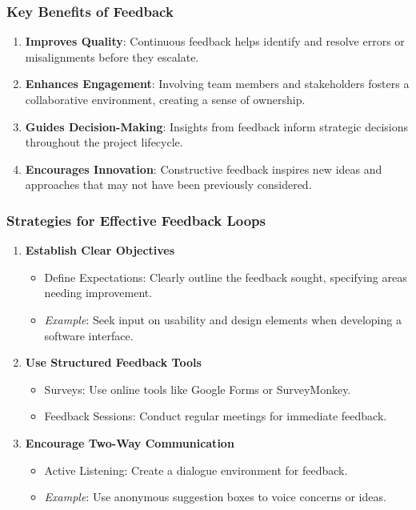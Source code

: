 \documentclass[aspectratio=169]{beamer}
\begin{document}
\begin{frame}[fragile]
    \frametitle{Key Benefits of Feedback}
    \begin{enumerate}
        \item \textbf{Improves Quality}: Continuous feedback helps identify and resolve errors or misalignments before they escalate.
        \item \textbf{Enhances Engagement}: Involving team members and stakeholders fosters a collaborative environment, creating a sense of ownership.
        \item \textbf{Guides Decision-Making}: Insights from feedback inform strategic decisions throughout the project lifecycle.
        \item \textbf{Encourages Innovation}: Constructive feedback inspires new ideas and approaches that may not have been previously considered.
    \end{enumerate}
\end{frame}

\begin{frame}[fragile]
    \frametitle{Strategies for Effective Feedback Loops}
    \begin{enumerate}
        \item \textbf{Establish Clear Objectives}
            \begin{itemize}
                \item Define Expectations: Clearly outline the feedback sought, specifying areas needing improvement.
                \item \textit{Example}: Seek input on usability and design elements when developing a software interface.
            \end{itemize}
        \item \textbf{Use Structured Feedback Tools}
            \begin{itemize}
                \item Surveys: Use online tools like Google Forms or SurveyMonkey.
                \item Feedback Sessions: Conduct regular meetings for immediate feedback.
            \end{itemize}
        \item \textbf{Encourage Two-Way Communication}
            \begin{itemize}
                \item Active Listening: Create a dialogue environment for feedback.
                \item \textit{Example}: Use anonymous suggestion boxes to voice concerns or ideas.
            \end{itemize}
    \end{enumerate}
\end{frame}
\end{document}
